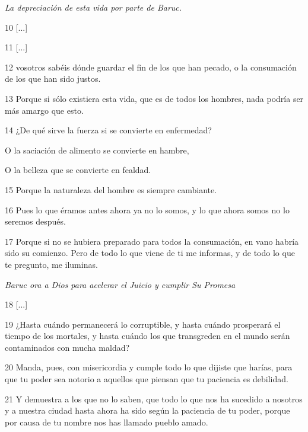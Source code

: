 \par \textit{La depreciación de esta vida por parte de Baruc.}

\par 10 [...]

\par 11 [...]

\par 12 vosotros sabéis dónde guardar el fin de los que han pecado, o la consumación de los que han sido justos.

\par 13 Porque si sólo existiera esta vida, que es de todos los hombres, nada podría ser más amargo que esto.

\par 14 ¿De qué sirve la fuerza si se convierte en enfermedad?

\par O la saciación de alimento se convierte en hambre,

\par O la belleza que se convierte en fealdad.

\par 15 Porque la naturaleza del hombre es siempre cambiante.

\par 16 Pues lo que éramos antes ahora ya no lo somos, y lo que ahora somos no lo seremos después.

\par 17 Porque si no se hubiera preparado para todos la consumación, en vano habría sido su comienzo. Pero de todo lo que viene de ti me informas, y de todo lo que te pregunto, me iluminas.

\par \textit{Baruc ora a Dios para acelerar el Juicio y cumplir Su Promesa}

\par 18 [...]

\par 19 ¿Hasta cuándo permanecerá lo corruptible, y hasta cuándo prosperará el tiempo de los mortales, y hasta cuándo los que transgreden en el mundo serán contaminados con mucha maldad?

\par 20 Manda, pues, con misericordia y cumple todo lo que dijiste que harías, para que tu poder sea notorio a aquellos que piensan que tu paciencia es debilidad.

\par 21 Y demuestra a los que no lo saben, que todo lo que nos ha sucedido a nosotros y a nuestra ciudad hasta ahora ha sido según la paciencia de tu poder, porque por causa de tu nombre nos has llamado pueblo amado.

